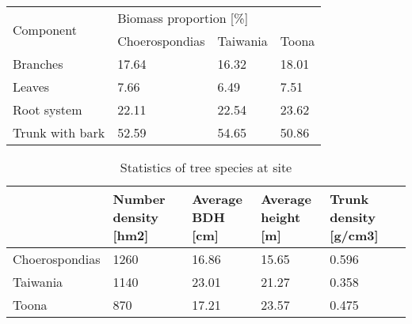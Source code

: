 \begin{table}[ht]
\centering
\begin{tabular}{llll} 
\hline
\multirow{2}{*}{Component} & \multicolumn{3}{l}{Biomass proportion [\%]}  \\
                           & Choerospondias & Taiwania & Toona            \\ 
\hline
Branches                   & 17.64          & 16.32    & 18.01            \\
Leaves                     & 7.66           & 6.49     & 7.51             \\
Root system                & 22.11          & 22.54    & 23.62            \\
Trunk with bark            & 52.59          & 54.65    & 50.86            \\
\hline
\end{tabular}
\end{table}

\begin{table}[ht]
\centering
\caption{Statistics of tree species at site}
\begin{tabular}{lllll}
\hline
               & \makecell{Number\\ density [hm2]} & \makecell{Average\\ BDH [cm]} & \makecell{Average\\ height [m]} & \makecell{Trunk\\ density [g/cm3]}  \\
\hline
Choerospondias & 1260                   & 16.86            & 15.65              & 0.596                    \\
Taiwania       & 1140                   & 23.01            & 21.27              & 0.358                    \\
Toona          & 870                    & 17.21            & 23.57              & 0.475                    \\
\hline
\end{tabular}
\end{table}